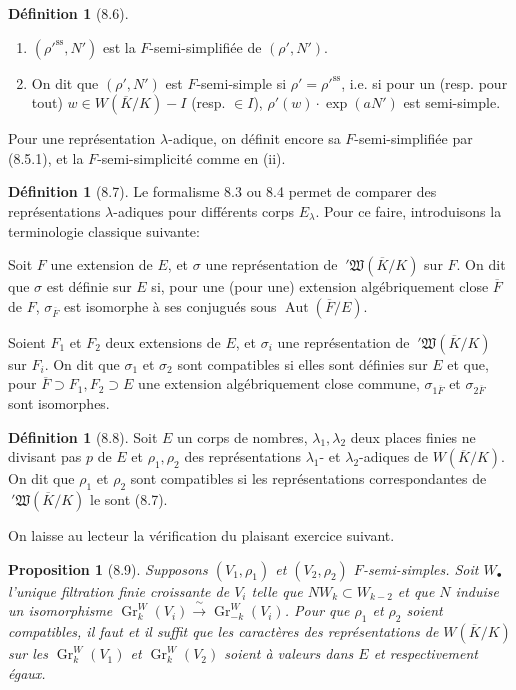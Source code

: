 \documentclass[11pt]{amsart}
\theoremstyle{plain}
\newtheorem{proposition}[theorem]{Proposition}
\theoremstyle{definition}
\newtheorem{definition}[theorem]{D\'efinition}
\DeclareMathOperator{\Aut}{Aut}
\DeclareMathOperator{\gr}{Gr}
\begin{document}
\begin{definition}[8.6]
\begin{enumerate}
\item[(i)] $(\rho'^{\mathrm{ss}},N')$ est la $F$-semi-simplifi\'ee de $(\rho',N')$.
\item[(ii)] On dit que $(\rho',N')$ est $F$-semi-simple si $\rho' = \rho'^{\mathrm{ss}}$, i.e. si pour un (resp. pour tout) $w \in W(\overline{K}/K) - I$ (resp. $\in I$), $\rho'(w) \cdot \exp(aN')$ est semi-simple.
\end{enumerate}
Pour une repr\'esentation $\lambda$-adique, on d\'efinit encore sa $F$-semi-simplifi\'ee par (8.5.1), et la $F$-semi-simplicit\'e comme en (ii).
\end{definition}

\begin{definition}[8.7]
Le formalisme 8.3 ou 8.4 permet de comparer des repr\'esentations $\lambda$-adiques pour diff\'erents corps $E_\lambda$. Pour ce faire, introduisons la terminologie classique suivante:

Soit $F$ une extension de $E$, et $\sigma$ une repr\'esentation de $\ '\mathfrak{W}(\overline{K}/K)$ sur $F$. On dit que $\sigma$ est d\'efinie sur $E$ si, pour une (pour une) extension alg\'ebriquement close $\overline{F}$ de $F$, $\sigma_{\overline{F}}$ est isomorphe \`a ses conjugu\'es sous $\Aut(\overline{F}/E)$.

Soient $F_1$ et $F_2$ deux extensions de $E$, et $\sigma_i$ une repr\'esentation de $\ '\mathfrak{W}(\overline{K}/K)$ sur $F_i$. On dit que $\sigma_1$ et $\sigma_2$ sont compatibles si elles sont d\'efinies sur $E$ et que, pour $\overline{F} \supset F_1, F_2 \supset E$ une extension alg\'ebriquement close commune, $\sigma_{1\overline{F}}$ et $\sigma_{2\overline{F}}$ sont isomorphes.
\end{definition}

\begin{definition}[8.8]
Soit $E$ un corps de nombres, $\lambda_1, \lambda_2$ deux places finies ne divisant pas $p$ de $E$ et $\rho_1, \rho_2$ des repr\'esentations $\lambda_1$- et $\lambda_2$-adiques de $W(\overline{K}/K)$. On dit que $\rho_1$ et $\rho_2$ sont compatibles si les repr\'esentations correspondantes de $\ '\mathfrak{W}(\overline{K}/K)$ le sont (8.7).
\end{definition}

On laisse au lecteur la v\'erification du plaisant exercice suivant.

\begin{proposition}[8.9]
Supposons $(V_1,\rho_1)$ et $(V_2,\rho_2)$ $F$-semi-simples. Soit $W_\bullet$ l'unique filtration finie croissante de $V_i$ telle que $N W_k \subset W_{k-2}$ et que $N$ induise un isomorphisme $\gr_k^W(V_i) \xrightarrow{\;\sim\;} \gr_{-k}^W(V_i)$. Pour que $\rho_1$ et $\rho_2$ soient compatibles, il faut et il suffit que les caract\`eres des repr\'esentations de $W(\overline{K}/K)$ sur les $\gr_k^W(V_1)$ et $\gr_k^W(V_2)$ soient \`a valeurs dans $E$ et respectivement \'egaux.
\end{proposition}
\end{document}
